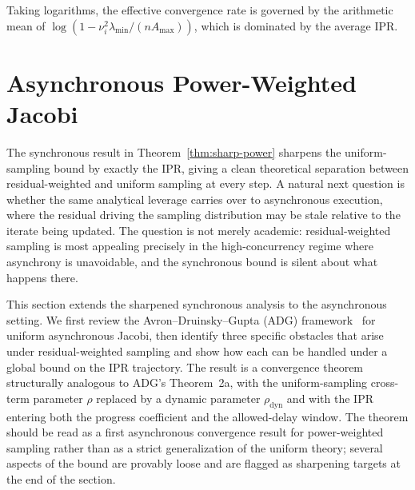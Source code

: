 \documentclass[pdflatex,sn-mathphys-num]{sn-jnl}%
\newcommand{\lmin}{\lambda_{\min}}
\theoremstyle{thmstyleone}%
\theoremstyle{thmstyletwo}%
\theoremstyle{thmstylethree}%
\begin{document}
\noindent
Taking logarithms, the effective convergence rate is governed by the arithmetic mean of $\log(1 - \nu_i^2 \lmin/(nA_{\max}))$, which is dominated by the average IPR.


\section{Asynchronous Power-Weighted Jacobi}
\label{sec:async}

The synchronous result in Theorem~\ref{thm:sharp-power} sharpens the
uniform-sampling bound by exactly the IPR, giving a clean theoretical
separation between residual-weighted and uniform sampling at every
step. A natural next question is whether the same analytical leverage
carries over to asynchronous execution, where the residual driving the
sampling distribution may be stale relative to the iterate being
updated. The question is not merely academic: residual-weighted
sampling is most appealing precisely in the high-concurrency regime
where asynchrony is unavoidable, and the synchronous bound is silent
about what happens there.

This section extends the sharpened synchronous analysis to the
asynchronous setting. We first review the Avron--Druinsky--Gupta (ADG)
framework~\cite{avron2015revisiting} for uniform asynchronous Jacobi,
then identify three specific obstacles that arise under
residual-weighted sampling and show how each can be handled under a
global bound on the IPR trajectory. The result is a convergence
theorem structurally analogous to ADG's Theorem~2a, with the
uniform-sampling cross-term parameter $\rho$ replaced by a dynamic
parameter $\rho_{\text{dyn}}$ and with the IPR entering both the
progress coefficient and the allowed-delay window. The theorem should
be read as a first asynchronous convergence result for power-weighted
sampling rather than as a strict generalization of the uniform theory;
several aspects of the bound are provably loose and are flagged as
sharpening targets at the end of the section.

\end{document}
